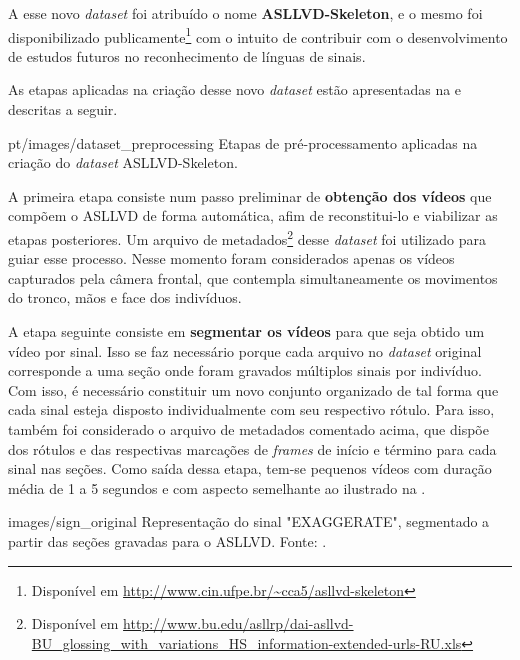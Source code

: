 A esse novo \textit{dataset} foi atribuído o nome \textbf{ASLLVD-Skeleton}, e o mesmo foi disponibilizado publicamente\footnote{
    Disponível em \url{http://www.cin.ufpe.br/~cca5/asllvd-skeleton}
} com o intuito de contribuir com o desenvolvimento de estudos futuros no reconhecimento de línguas de sinais.

As etapas aplicadas na criação desse novo \textit{dataset} estão apresentadas na  e descritas a seguir.

    {pt/images/dataset_preprocessing}
    {Etapas de pré-processamento aplicadas na criação do \textit{dataset} ASLLVD-Skeleton.}

A primeira etapa consiste num passo preliminar de \textbf{obtenção dos vídeos} que compõem o ASLLVD de forma automática, afim de reconstitui-lo e viabilizar as etapas posteriores. Um arquivo de metadados\footnote{
    Disponível em \url{http://www.bu.edu/asllrp/dai-asllvd-BU_glossing_with_variations_HS_information-extended-urls-RU.xls}
} desse \textit{dataset} foi utilizado para guiar esse processo. Nesse momento foram considerados apenas os vídeos capturados pela câmera frontal, que contempla simultaneamente os movimentos do tronco, mãos e face dos indivíduos.

A etapa seguinte consiste em \textbf{segmentar os vídeos} para que seja obtido um vídeo por sinal. Isso se faz necessário porque cada arquivo no \textit{dataset} original corresponde a uma seção onde foram gravados múltiplos sinais por indivíduo. Com isso, é necessário constituir um novo conjunto organizado de tal forma que cada sinal esteja disposto individualmente com seu respectivo rótulo. Para isso, também foi considerado o arquivo de metadados comentado acima, que dispõe dos rótulos e das respectivas marcações de \textit{frames} de início e término para cada sinal nas seções. Como saída dessa etapa, tem-se pequenos vídeos com duração média de 1 a 5 segundos e com aspecto semelhante ao ilustrado na .

    {images/sign_original}
    {Representação do sinal "EXAGGERATE", segmentado a partir das seções gravadas para o ASLLVD. Fonte: \cite{athitsos-asllvd-2008}.}

